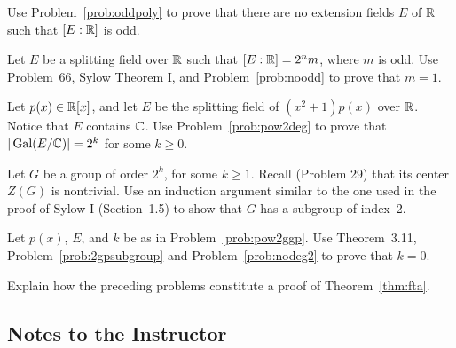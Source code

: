 \begin{problem}\label{prob:noodd}
    Use Problem~\ref{prob:oddpoly} to prove that there are no extension fields $E$ of $\mathbb{R}$ such that $[E:\mathbb{R}]$ is odd.
\end{problem}





\begin{problem}\label{prob:pow2deg}
    Let $E$ be a splitting field over $\mathbb{R}$ such that $[E:\mathbb{R}] = 2^n m$, where $m$ is odd. Use Problem~66, Sylow Theorem I, and Problem~\ref{prob:noodd} to prove that $m=1$.
\end{problem}



\begin{problem}\label{prob:pow2ggp}
    Let $p(x) \in \mathbb{R}[x]$, and let $E$ be the splitting field of $(x^2+1)p(x)$ over $\mathbb{R}$. Notice that $E$ contains $\mathbb{C}$. Use Problem~\ref{prob:pow2deg} to prove that $|\operatorname{Gal}(E/\mathbb{C})| = 2^k$ for some $k \geq 0$.
\end{problem}



\begin{problem}\label{prob:2gpsubgroup}
    Let $G$ be a group of order $2^k$, for some $k\geq 1$. Recall (Problem 29) that its center $Z(G)$ is nontrivial. Use an induction argument similar to the one used in the proof of Sylow I (Section~1.5) to show that $G$ has a subgroup of index~2.
\end{problem}



\begin{problem}
    Let $p(x)$, $E$, and $k$ be as in Problem~\ref{prob:pow2ggp}. Use Theorem~3.11, Problem~\ref{prob:2gpsubgroup} and Problem~\ref{prob:nodeg2} to prove that $k=0$.
\end{problem}



\begin{problem}
    Explain how the preceding problems constitute a proof of Theorem~\ref{thm:fta}.
\end{problem}


\backmatter

\begin{annotation}
 \chapter{Notes to the Instructor}

 \renewcommand\notesname{}
 \vspace{-2cm}
 \begingroup
 \setlength{\parskip}{2ex}
 \def\enotesize{\large} %
 \theendnotes
 \endgroup
\end{annotation}

\vspace{.1in}


